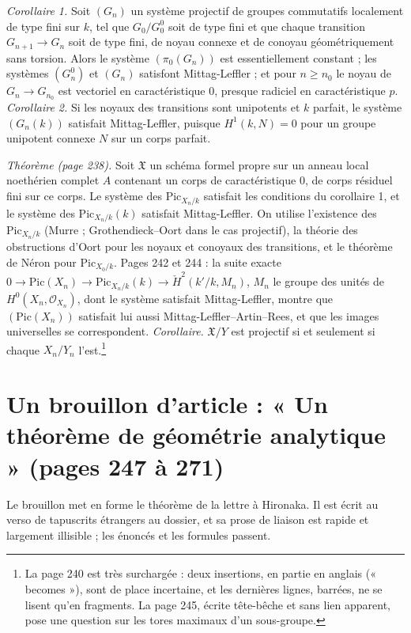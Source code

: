 \documentclass[11pt,a4paper]{article}
\begin{document}
\emph{Corollaire 1.} Soit $(G_n)$ un système projectif de groupes commutatifs
localement de type fini sur $k$, tel que $G_0/G_0^0$ soit de type fini et que
chaque transition $G_{n+1} \to G_n$ soit de type fini, de noyau connexe et de
conoyau géométriquement sans torsion. Alors le système $(\pi_0(G_n))$ est
essentiellement constant ; les systèmes $(G_n^0)$ et $(G_n)$ satisfont
Mittag-Leffler ; et pour $n \geq n_0$ le noyau de $G_n \to G_{n_0}$ est vectoriel
en caractéristique $0$, presque radiciel en caractéristique $p$.
\emph{Corollaire 2.} Si les noyaux des transitions sont unipotents et $k$
parfait, le système $(G_n(k))$ satisfait Mittag-Leffler, puisque
$H^1(k, N) = 0$ pour un groupe unipotent connexe $N$ sur un corps parfait.

\emph{Théorème (page 238).} Soit $\mathfrak{X}$ un schéma formel propre sur un
anneau local noethérien complet $A$ contenant un corps de caractéristique $0$,
de corps résiduel fini sur ce corps. Le système des $\mathrm{Pic}_{X_n/k}$
satisfait les conditions du corollaire 1, et le système des
$\mathrm{Pic}_{X_n/k}(k)$ satisfait Mittag-Leffler. On utilise l'existence des
$\mathrm{Pic}_{X_n/k}$ (Murre ; Grothendieck--Oort dans le cas projectif), la
théorie des obstructions d'Oort pour les noyaux et conoyaux des transitions, et
le théorème de Néron pour $\mathrm{Pic}_{X_0/k}$. Pages 242 et 244 : la suite
exacte
$0 \to \mathrm{Pic}(X_n) \to \mathrm{Pic}_{X_n/k}(k) \to \check{H}^2(k'/k, M_n)$,
$M_n$ le groupe des unités de $H^0(X_n, \mathcal{O}_{X_n})$, dont le système
satisfait Mittag-Leffler, montre que $(\mathrm{Pic}(X_n))$ satisfait lui aussi
Mittag-Leffler--Artin--Rees, et que les images universelles se correspondent.
\emph{Corollaire.} $\mathfrak{X}/Y$ est projectif si et seulement si chaque
$X_n/Y_n$ l'est.\footnote{La page 240 est très surchargée : deux insertions, en
partie en anglais (« becomes »), sont de place incertaine, et les dernières
lignes, barrées, ne se lisent qu'en fragments. La page 245, écrite tête-bêche
et sans lien apparent, pose une question sur les tores maximaux d'un
sous-groupe.}

\section*{Un brouillon d'article : « Un théorème de géométrie analytique » (pages 247 à 271)}

Le brouillon met en forme le théorème de la lettre à Hironaka. Il est écrit
au verso de tapuscrits étrangers au dossier, et sa prose de liaison est rapide
et largement illisible ; les énoncés et les formules passent.
\end{document}

